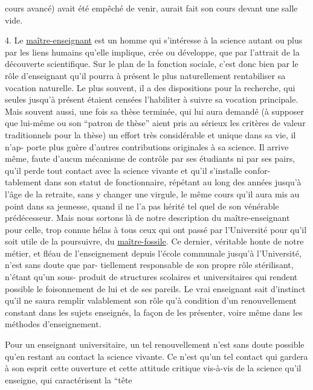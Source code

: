 
cours avancé) avait été empêché de venir, aurait fait son cours devant une
salle vide.

4. Le \uline{maître-enseignant} est un homme qui s'intéresse à la science autant ou
plus par les liens humains qu'elle implique, crée ou développe, que par
l'attrait de la découverte scientifique. Sur le plan de la fonction sociale,
c'est donc bien par le rôle d'enseignant qu'il pourra à présent le plus
naturellement rentabiliser sa vocation naturelle. Le plus souvent, il a des
dispositions pour la recherche, qui seules jusqu'à présent étaient censées
l'habiliter à suivre sa vocation principale. Mais souvent aussi, une fois sa
thèse terminée, qui lui aura demandé (à supposer que lui-même ou son
``patron de thèse'' aient pris au sérieux les critères de valeur traditionnels
pour la thèse) un effort très considérable et unique dans sa vie, il n'ap-%
porte plus guère d'autres contributions originales à sa science. Il arrive
même, faute d'aucun mécanisme de contrôle par ses étudiants ni par ses pairs,
qu'il perde tout contact avec la science vivante et qu'il s'installe confor-%
tablement dans son statut de fonctionnaire, répétant au long des années
jusqu'à l'âge de la retraite, sans y changer une virgule, le même cours qu'il
aura mis au point dans sa jeunesse, quand il ne l'a pas hérité tel quel
de son vénérable prédécesseur. Mais nous sortons là de notre description du
maître-enseignant pour celle, trop connue hélas à tous ceux qui ont passé
par l'Université pour qu'il soit utile de la poursuivre, du \uline{maître-fossile}.
Ce dernier, véritable honte de notre métier, et fléau de l'enseignement
depuis l'école communale jusqu'à l'Université, n'est sans doute que par-%
tiellement responsable de son propre rôle stérilisant, n'étant qu'un sous-%
produit de structures scolaires et universitaires qui rendent possible le
foisonnement de lui et de ses pareils. Le vrai enseignant sait d'instinct
qu'il ne saura remplir valablement son rôle qu'à condition d'un renouvellement
constant dans les sujets enseignés, la façon de les présenter, voire même
dans les méthodes d'enseignement.

Pour un enseignant universitaire, un tel renouvellement n'est sans
doute possible qu'en restant au contact  la science vivante. Ce n'est
qu'un tel contact qui gardera à son esprit cette ouverture et cette attitude
critique vis-à-vis de la science qu'il enseigne, qui caractérisent la ``tête

